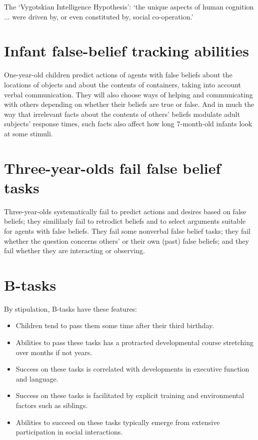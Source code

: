 \documentclass[11pt]{extarticle}
\begin{document}
\begin{multicols}{3}
The `Vygotskian Intelligence Hypothesis': `the unique aspects of human cognition ... were driven by, or even constituted by, social co-operation.'\citep%
{Moll:2007gu}



\section{Infant false-belief tracking abilities}
One-year-old children predict actions of agents with false beliefs about the locations of objects\citep{Clements:1994cw,Onishi:2005hm,Southgate:2007js} and about the contents of containers,\citep{he:2011_false} 
taking into account verbal communication.\citep{Song:2008qo,scott:2012_verbal_fb}
They will also choose ways of helping\citep[]{Buttelmann:2009gy} and communicating\citep{Knudsen:2011fk,southgate:2010fb} with others depending on whether their beliefs are true or false.  
And in much the way that irrelevant facts about the contents of others’ beliefs modulate adult subjects’ response times, such facts also affect how long 7-month-old infants look at some stimuli.\citep[]{kovacs_social_2010}


\section{Three-year-olds fail false belief tasks}
Three-year-olds systematically fail to predict actions\citep{Wimmer:1983dz} and desires\citep{Astington:1991kk} based on false beliefs; they simililarly fail to retrodict beliefs\citep{Wimmer:1998kx} and to select arguments suitable for agents with false beliefs.\citep{Bartsch:2000es}
They fail some nonverbal false belief tasks;\citealp{Call:1999co,low:2010_preschoolers}
they fail whether the question concerns others' or their own (past) false beliefs;\citep{Gopnik:1991db}
and they fail whether they are interacting or observing.\citep{Chandler:1989qa}

\section{B-tasks}
By stipulation, B-tasks have these features:
\begin{itemize}
\item Children tend to pass them some time after their third birthday.
\item Abilities to pass these tasks has a protracted developmental course stretching over months if not years.
\item Success on these tasks is correlated with developments in executive function\citep[]{Perner:1999yr, Sabbagh:2006ke} and language.\citep[]{Astington2005ot}
\item Success on these tasks is facilitated by explicit training\citep[]{Slaughter:1996fv} and environmental factors such as siblings.\citep[]{Clements:2000nc, Hughes:2004zj}
\item Abilities to succeed on these tasks typically emerge from extensive participation in social interactions.\citealp{Hughes:2006fu}
\end{itemize}



\end{multicols}
\end{document}
